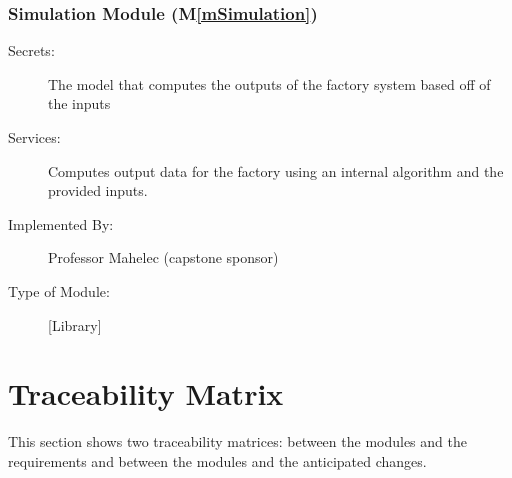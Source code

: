 \documentclass[12pt, titlepage]{article}
\newcommand{\mref}[1]{M\ref{#1}}
\begin{document}
\subsubsection{Simulation Module (\mref{mSimulation})}
\begin{description}
\item[Secrets:] The model that computes the outputs of the factory system based off of the inputs 
\item[Services:] Computes output data for the factory using an internal algorithm and the provided inputs. 
\item[Implemented By:] Professor Mahelec (capstone sponsor)
\item[Type of Module:] [Library]
\end{description}

\section{Traceability Matrix} \label{SecTM}

This section shows two traceability matrices: between the modules and the
requirements and between the modules and the anticipated changes.
\end{document}
